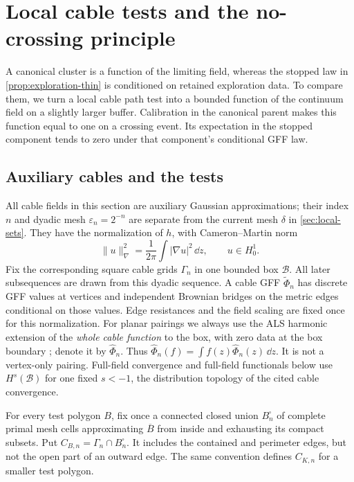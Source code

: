\section{Local cable tests and the no-crossing principle}
\label{sec:local-kernel}

A canonical cluster is a function of the limiting field, whereas the
stopped law in \cref{prop:exploration-thin} is conditioned on retained
exploration data. To compare them, we turn a local cable path test into
a bounded function of the continuum field on a slightly larger buffer.
Calibration in the canonical parent makes this function equal to one
on a crossing event. Its expectation in the stopped component tends to
zero under that component's conditional GFF law.

\subsection{Auxiliary cables and the tests}

All cable fields in this section are auxiliary Gaussian approximations;
their index \(n\) and dyadic mesh \(\varepsilon_n=2^{-n}\) are separate from
the current mesh \(\delta\) in \cref{sec:local-sets}. They have the
normalization of \(h\), with Cameron--Martin norm
\begin{equation}
 \|u\|_{\nabla}^{2}=\frac1{2\pi}\int |\nabla u|^{2}\,\dd z,
 \qquad u\in H^1_0.
 \label{eq:kernel-energy}
\end{equation}
Fix the corresponding square cable grids \(\Gamma_n\) in one bounded
box \(\mathcal B\). All later subsequences are drawn from this dyadic
sequence. A cable GFF
\(\widetilde\Phi_n\) has discrete GFF values at vertices and independent
Brownian bridges on the metric edges conditional on those values. Edge
resistances and the field scaling are fixed once for this normalization.
For planar pairings we always use the ALS harmonic extension of the
\emph{whole cable function} to the box, with zero data at the box boundary
\cite[Sections~2.1 and~4.1]{ALS2018}; denote it by
\(\widehat\Phi_n\). Thus
\(\widehat\Phi_n(f)=\int f(z)\widehat\Phi_n(z)\,\dd z\).
It is not a vertex-only pairing.
Full-field convergence and full-field functionals below use
\(H^s(\mathcal B)\) for one fixed \(s<-1\), the distribution topology
of the cited cable convergence.

For every test polygon \(B\), fix once a connected closed union
\(B_n^\square\) of complete primal mesh cells approximating
\(\overline B\) from inside and exhausting its compact subsets. Put
\(C_{B,n}=\Gamma_n\cap B_n^\square\). It includes the contained and
perimeter edges, but not the open part of an outward edge. The same
convention defines \(C_{K,n}\) for a smaller test polygon.


